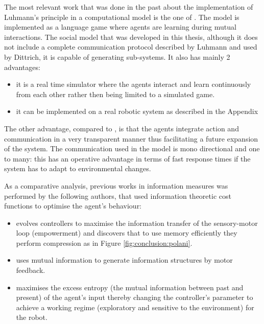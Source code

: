 The most relevant work that was done in the past about the implementation
of Luhmann's principle in a computational model is the one of \citet{SocialOrderScalability}.
The model is implemented as a language game where agents are learning
during mutual interactions.
The social model that was developed in this thesis, although it does not include
 a complete communication protocol described by Luhmann and used by Dittrich,
it is capable of generating sub-systems.
It also has mainly 2 advantages:
\begin{itemize}
 \item it is a real time simulator where the agents interact and learn continuously
 from each other rather then being limited to a simulated game.
 \item it can be implemented on a real robotic system as described in the Appendix 
\end{itemize}

The other advantage, compared to \citet{SocialOrderScalability}, is that
the agents integrate action and communication in a very transparent manner
thus facilitating a future expansion of the system.
The communication used in the model is mono directional and one to many:
this has an operative advantage in terms of fast response times if the
system has to adapt to environmental changes.

As a comparative analysis, previous works in information measures was performed by the following authors,
that used information theoretic cost functions to optimise the agent's behaviour:
\begin{itemize}
\item \citet{organizationInfo} evolves controllers to maximise the information transfer
of the sensory-motor loop (empowerment) and discovers that to use memory efficiently they perform 
compression as in Figure \ref{fig:conclusion:polani}.
\item \citet{LungarellaInformation} uses mutual information to generate information structures by motor feedback.
\item \citet{AyClosedLoop} maximises the excess entropy (the mutual information between past and present) 
 of the agent's input thereby changing the controller's parameter to achieve a 
 working regime (exploratory and sensitive to the environment) for the robot.
\end{itemize}

